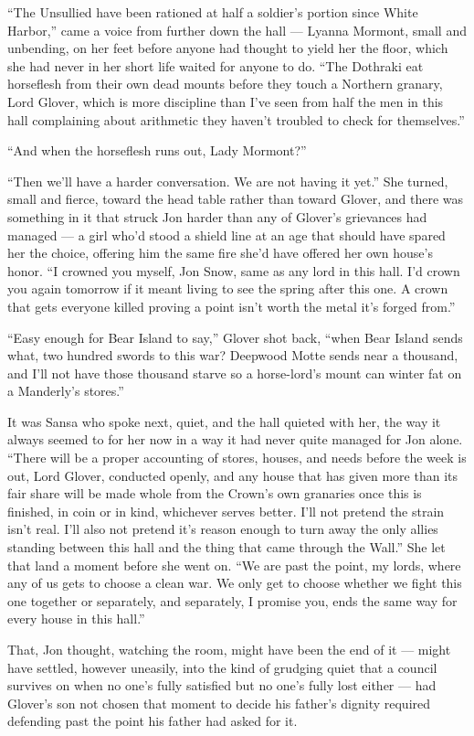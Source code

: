 “The Unsullied have been rationed at half a soldier’s portion since White Harbor,” came a voice from further down the hall — Lyanna Mormont, small and unbending, on her feet before anyone had thought to yield her the floor, which she had never in her short life waited for anyone to do. “The Dothraki eat horseflesh from their own dead mounts before they touch a Northern granary, Lord Glover, which is more discipline than I’ve seen from half the men in this hall complaining about arithmetic they haven’t troubled to check for themselves.”

“And when the horseflesh runs out, Lady Mormont?”

“Then we’ll have a harder conversation. We are not having it yet.” She turned, small and fierce, toward the head table rather than toward Glover, and there was something in it that struck Jon harder than any of Glover’s grievances had managed — a girl who’d stood a shield line at an age that should have spared her the choice, offering him the same fire she’d have offered her own house’s honor. “I crowned you myself, Jon Snow, same as any lord in this hall. I’d crown you again tomorrow if it meant living to see the spring after this one. A crown that gets everyone killed proving a point isn’t worth the metal it’s forged from.”

“Easy enough for Bear Island to say,” Glover shot back, “when Bear Island sends what, two hundred swords to this war? Deepwood Motte sends near a thousand, and I’ll not have those thousand starve so a horse-lord’s mount can winter fat on a Manderly’s stores.”

It was Sansa who spoke next, quiet, and the hall quieted with her, the way it always seemed to for her now in a way it had never quite managed for Jon alone. “There will be a proper accounting of stores, houses, and needs before the week is out, Lord Glover, conducted openly, and any house that has given more than its fair share will be made whole from the Crown’s own granaries once this is finished, in coin or in kind, whichever serves better. I’ll not pretend the strain isn’t real. I’ll also not pretend it’s reason enough to turn away the only allies standing between this hall and the thing that came through the Wall.” She let that land a moment before she went on. “We are past the point, my lords, where any of us gets to choose a clean war. We only get to choose whether we fight this one together or separately, and separately, I promise you, ends the same way for every house in this hall.”

That, Jon thought, watching the room, might have been the end of it — might have settled, however uneasily, into the kind of grudging quiet that a council survives on when no one’s fully satisfied but no one’s fully lost either — had Glover’s son not chosen that moment to decide his father’s dignity required defending past the point his father had asked for it.

